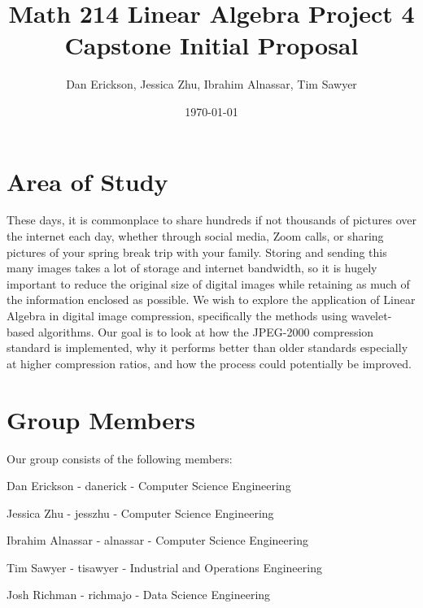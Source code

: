 \documentclass[12pt]{article}
\title{ Math 214 Linear Algebra Project 4 Capstone Initial Proposal }
\date{\today}
\author{Dan Erickson, Jessica Zhu, Ibrahim Alnassar, Tim Sawyer}
\begin{document}
\maketitle

\section{Area of Study}

These days, it is commonplace to share hundreds if not thousands of pictures over the internet each day, whether through social media, Zoom calls, or sharing pictures of your spring break trip with your family. Storing and sending this many images takes a lot of storage and internet bandwidth, so it is hugely important to reduce the original size of digital images while retaining as much of the information enclosed as possible. We wish to explore the application of Linear Algebra in digital image compression, specifically the methods using wavelet-based algorithms. Our goal is to look at how the JPEG-2000 compression standard is implemented, why it performs better than older standards especially at higher compression ratios, and how the process could potentially be improved.

\section{Group Members}

Our group consists of the following members:

\begin{list}{}{}
	\item Dan Erickson - danerick - Computer Science Engineering
	\item Jessica Zhu - jesszhu - Computer Science Engineering
	\item Ibrahim Alnassar - alnassar - Computer Science Engineering
	\item Tim Sawyer - tisawyer - Industrial and Operations Engineering
	\item Josh Richman - richmajo - Data Science Engineering
\end{list}
\end{document}
